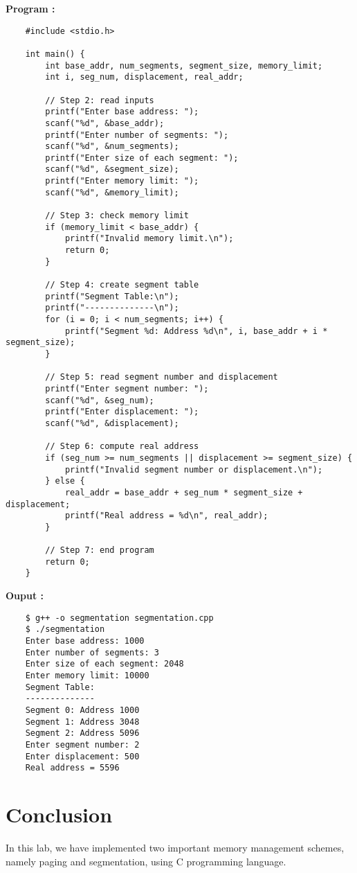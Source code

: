 \documentclass[journal,onecolumn]{IEEEtran}
\begin{document}
\textbf{Program : }
\begin{verbatim}
    #include <stdio.h>

    int main() {
        int base_addr, num_segments, segment_size, memory_limit;
        int i, seg_num, displacement, real_addr;
        
        // Step 2: read inputs
        printf("Enter base address: ");
        scanf("%d", &base_addr);
        printf("Enter number of segments: ");
        scanf("%d", &num_segments);
        printf("Enter size of each segment: ");
        scanf("%d", &segment_size);
        printf("Enter memory limit: ");
        scanf("%d", &memory_limit);
        
        // Step 3: check memory limit
        if (memory_limit < base_addr) {
            printf("Invalid memory limit.\n");
            return 0;
        }
        
        // Step 4: create segment table
        printf("Segment Table:\n");
        printf("--------------\n");
        for (i = 0; i < num_segments; i++) {
            printf("Segment %d: Address %d\n", i, base_addr + i * segment_size);
        }
        
        // Step 5: read segment number and displacement
        printf("Enter segment number: ");
        scanf("%d", &seg_num);
        printf("Enter displacement: ");
        scanf("%d", &displacement);
        
        // Step 6: compute real address
        if (seg_num >= num_segments || displacement >= segment_size) {
            printf("Invalid segment number or displacement.\n");
        } else {
            real_addr = base_addr + seg_num * segment_size + displacement;
            printf("Real address = %d\n", real_addr);
        }
        
        // Step 7: end program
        return 0;
    }    
\end{verbatim}


\textbf{Ouput :}
\begin{verbatim}
    $ g++ -o segmentation segmentation.cpp 
    $ ./segmentation
    Enter base address: 1000
    Enter number of segments: 3
    Enter size of each segment: 2048
    Enter memory limit: 10000
    Segment Table:
    --------------
    Segment 0: Address 1000
    Segment 1: Address 3048
    Segment 2: Address 5096
    Enter segment number: 2
    Enter displacement: 500
    Real address = 5596
\end{verbatim}

\section{Conclusion}
In this lab, we have implemented two important memory management schemes, namely paging and segmentation, using C programming language.
\end{document}
